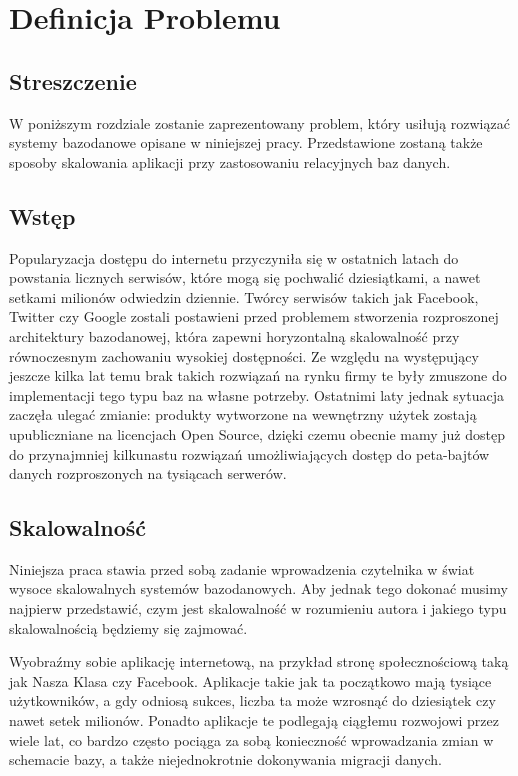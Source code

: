 \chapter{Definicja Problemu}

\section*{Streszczenie}
W poniższym rozdziale zostanie zaprezentowany problem, który usiłują rozwiązać systemy bazodanowe opisane w niniejszej pracy.
Przedstawione zostaną także sposoby skalowania aplikacji przy zastosowaniu relacyjnych baz danych.

\section{Wstęp}
Popularyzacja dostępu do internetu przyczyniła się w ostatnich latach do  powstania licznych serwisów, które mogą się pochwalić dziesiątkami, a nawet setkami milionów odwiedzin dziennie. 
Twórcy serwisów takich jak Facebook, Twitter czy Google zostali postawieni przed problemem stworzenia rozproszonej architektury bazodanowej, która zapewni horyzontalną skalowalność przy równoczesnym zachowaniu wysokiej dostępności. 
Ze względu na występujący jeszcze kilka lat temu brak takich rozwiązań na rynku firmy te były zmuszone do implementacji tego typu baz na własne potrzeby. 
Ostatnimi laty jednak sytuacja zaczęła ulegać zmianie: produkty wytworzone na wewnętrzny użytek zostają upubliczniane na licencjach Open Source, dzięki czemu obecnie mamy już dostęp do przynajmniej kilkunastu rozwiązań umożliwiających dostęp do peta-bajtów danych rozproszonych na tysiącach serwerów.

\section{Skalowalność}
Niniejsza praca stawia przed sobą zadanie wprowadzenia czytelnika w świat wysoce skalowalnych systemów bazodanowych.
Aby jednak tego dokonać musimy najpierw przedstawić, czym jest skalowalność w rozumieniu autora i jakiego typu skalowalnością będziemy się zajmować.

Wyobraźmy sobie aplikację internetową, na przykład stronę społecznościową taką jak Nasza Klasa czy Facebook.
Aplikacje takie jak ta początkowo mają tysiące użytkowników, a gdy odniosą sukces, liczba ta może wzrosnąć do dziesiątek czy nawet setek milionów.
Ponadto aplikacje te podlegają ciągłemu rozwojowi przez wiele lat, co bardzo często pociąga za sobą konieczność wprowadzania zmian w schemacie bazy, a także niejednokrotnie dokonywania migracji danych.

